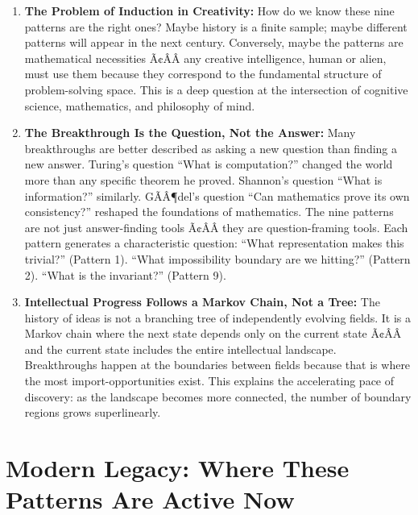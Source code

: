 \begin{enumerate}
\item \textbf{The Problem of Induction in Creativity:} How do we know these nine patterns are the right ones? Maybe history is a finite sample; maybe different patterns will appear in the next century. Conversely, maybe the patterns are mathematical necessities Ã¢ÂÂ any creative intelligence, human or alien, must use them because they correspond to the fundamental structure of problem-solving space. This is a deep question at the intersection of cognitive science, mathematics, and philosophy of mind.

\item \textbf{The Breakthrough Is the Question, Not the Answer:} Many breakthroughs are better described as asking a new question than finding a new answer. Turing's question ``What is computation?'' changed the world more than any specific theorem he proved. Shannon's question ``What is information?'' similarly. GÃÂ¶del's question ``Can mathematics prove its own consistency?'' reshaped the foundations of mathematics. The nine patterns are not just answer-finding tools Ã¢ÂÂ they are question-framing tools. Each pattern generates a characteristic question: ``What representation makes this trivial?'' (Pattern 1). ``What impossibility boundary are we hitting?'' (Pattern 2). ``What is the invariant?'' (Pattern 9).

\item \textbf{Intellectual Progress Follows a Markov Chain, Not a Tree:} The history of ideas is not a branching tree of independently evolving fields. It is a Markov chain where the next state depends only on the current state Ã¢ÂÂ and the current state includes the entire intellectual landscape. Breakthroughs happen at the boundaries between fields because that is where the most import-opportunities exist. This explains the accelerating pace of discovery: as the landscape becomes more connected, the number of boundary regions grows superlinearly.
\end{enumerate}

\section{Modern Legacy: Where These Patterns Are Active Now}
\label{sec:anatomy:legacy}

